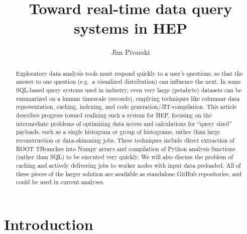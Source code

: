 \documentclass[a4paper]{jpconf}
\begin{document}
\title{Toward real-time data query systems in HEP}

\author{Jim Pivarski}

\address{147 N.\ Ridgeland Ave.\ Unit 3S, Oak Park, IL 60302, US}


\begin{abstract}
Exploratory data analysis tools must respond quickly to a user's questions, so that the answer to one question (e.g.\ a visualized distribution) can influence the next. In some SQL-based query systems used in industry, even very large (petabyte) datasets can be summarized on a human timescale (seconds), emplying techniques like columnar data representation, caching, indexing, and code generation/JIT-compilation. This article describes progress toward realizing such a system for HEP, focusing on the intermediate problems of optimizing data access and calculations for ``query sized'' payloads, such as a single histogram or group of histograms, rather than large reconstruction or data-skimming jobs. These techniques include direct extraction of ROOT TBranches into Numpy arrays and compilation of Python analysis functions (rather than SQL) to be executed very quickly. We will also discuss the problem of caching and actively delivering jobs to worker nodes with input data preloaded. All of these pieces of the larger solution are available as standalone GitHub repositories, and could be used in current analyses.
\end{abstract}

\section{Introduction}
\end{document}
